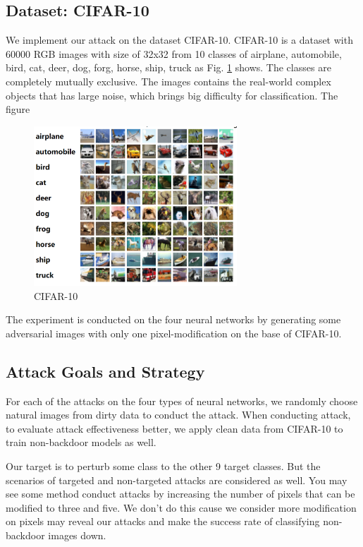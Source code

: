 \documentclass[runningheads]{llncs}
\begin{document}
\subsection{Dataset: CIFAR-10}
We implement our attack on the dataset CIFAR-10\cite{krizhevsky2009learning}. CIFAR-10 is a dataset with 60000 RGB images with size of 32x32 from 10 classes of airplane, automobile, bird, cat, deer, dog, forg, horse, ship, truck as Fig. \ref{dialog} shows. The classes are completely mutually exclusive. The images contains the real-world complex objects that has large noise, which brings big difficulty for classification. The figure

\begin{figure}[h]
	\centering
	\includegraphics[width=3.0in]{figures/cifar10.png}
	\caption{CIFAR-10} \label{dialog}
\end{figure}

The experiment is conducted on the four neural networks by generating some adversarial images with only one pixel-modification on the base of CIFAR-10. 

\subsection{Attack Goals and Strategy}
For each of the attacks on the four types of neural networks, we randomly choose natural images from dirty data to conduct the attack. When conducting attack, to evaluate attack effectiveness better, we apply clean data from CIFAR-10 to train non-backdoor models as well.

Our target is to perturb some class to the other 9 target classes. But the scenarios of targeted and non-targeted attacks are considered as well. You may see some method conduct attacks by increasing the number of pixels that can be modified to three and five\cite{su2019one}. We don't do this cause we consider more modification on pixels may reveal our attacks and make the success rate of classifying non-backdoor images down. 
\end{document}
